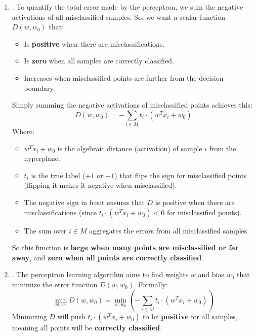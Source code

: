 \begin{enumerate}
    \item {}. To quantify the total error made by the perceptron, we sum the negative activations of all misclassified samples. So, we want a scalar function $D\left(w, w_0\right)$ that:
    \begin{itemize}
        \item Is \textbf{positive} when there are misclassifications.
        \item Is \textbf{zero} when all samples are correctly classified.
        \item Increases when misclassified points are further from the decision boundary.
    \end{itemize}
    Simply summing the negative activations of misclassified points achieves this:
    \begin{equation*}
        D\left(w, w_0\right) = - \sum_{i \in M} t_i \cdot \left(w^{T} x_i + w_0\right)
    \end{equation*}
    Where:
    \begin{itemize}
        \item $w^{T} x_i + w_0$ is the algebraic distance (activation) of sample $i$ from the hyperplane.
        \item $t_i$ is the true label ($+1$ or $-1$) that flips the sign for misclassified points (flipping it makes it negative when misclassified).
        \item The negative sign in front ensures that $D$ is positive when there are misclassifications (since $t_i \cdot \left(w^{T} x_i + w_0\right) < 0$ for misclassified points).
        \item The sum over $i \in M$ aggregates the errors from all misclassified samples.
    \end{itemize}
    So this function is \textbf{large when many points are misclassified or far away}, and \textbf{zero when all points are correctly classified}.


    \item {}. The perceptron learning algorithm aims to find weights $w$ and bias $w_0$ that minimize the error function $D\left(w, w_0\right)$. Formally:
    \begin{equation*}
        \min_{w, w_0} D\left(w, w_0\right) = \min_{w, w_0} \left( - \sum_{i \in M} t_i \cdot \left(w^{T} x_i + w_0\right) \right)
    \end{equation*}
    Minimizing $D$ will push $t_i \cdot \left(w^{T} x_i + w_0\right)$ to be \textbf{positive} for all samples, meaning all points will be \textbf{correctly classified}.
\end{enumerate}
